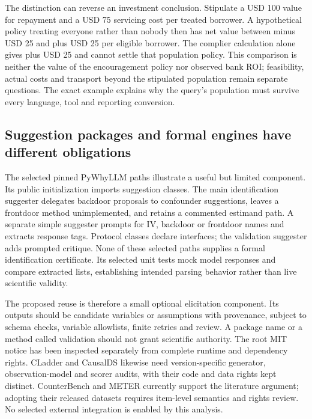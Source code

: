 The distinction can reverse an investment conclusion. Stipulate a USD 100 value
for repayment and a USD 75 servicing cost per treated borrower. A hypothetical
policy treating everyone rather than nobody then has net value between minus
USD 25 and plus USD 25 per eligible borrower. The complier calculation alone
gives plus USD 25 and cannot settle that population policy. This comparison is
neither the value of the encouragement policy nor observed bank ROI; feasibility,
actual costs and transport beyond the stipulated population remain separate
questions. The exact example explains why the query's population must survive
every language, tool and reporting conversion. \citep{exec14_ident_exact}

\subsection{Suggestion packages and formal engines have different obligations}

The selected pinned PyWhyLLM paths illustrate a useful but limited component.
Its public initialization imports suggestion classes. The main identification
suggester delegates backdoor proposals to confounder suggestions, leaves a
frontdoor method unimplemented, and retains a commented estimand path. A
separate simple suggester prompts for IV, backdoor or frontdoor names and
extracts response tags. Protocol classes declare interfaces; the validation
suggester adds prompted critique. None of these selected paths supplies a
formal identification certificate. Its selected unit tests mock model responses
and compare extracted lists, establishing intended parsing behavior rather than
live scientific validity. \citep{exec14_ident_packages}

The proposed reuse is therefore a small optional elicitation component. Its
outputs should be candidate variables or assumptions with provenance, subject
to schema checks, variable allowlists, finite retries and review. A package name
or a method called validation should not grant scientific authority. The
root MIT notice has been inspected separately from complete runtime and
dependency rights. CLadder and CausalDS likewise need version-specific
generator, observation-model and scorer audits, with their code and data rights
kept distinct. CounterBench and METER currently support the literature argument;
adopting their released datasets requires item-level semantics and rights review.
No selected external integration is enabled by this analysis.
\citep{exec14_ident_packages,exec14_ident_contract}

